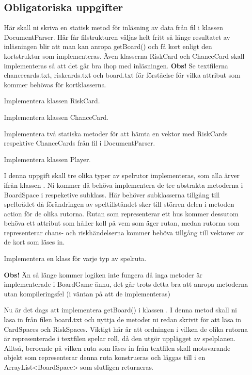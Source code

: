 \subsection{Obligatoriska uppgifter}

\Task Här skall ni skriva en statisk metod för inläsning av data från fil i klassen DocumentParser. Här får filstrukturen väljas helt fritt så länge resultatet av inläsningen blir att man kan anropa getBoard() och få kort enligt den kortstruktur som implementeras. Även klasserna RiskCard och ChanceCard skall implementeras så att det går bra ihop med inläsningen.\newline
\textbf{Obs!} Se textfilerna chancecards.txt, riskcards.txt och board.txt för förståelse för vilka attribut som kommer behövas för kortklasserna. 

\Subtask Implementera klassen RiskCard.

\Subtask Implementera klassen ChanceCard.

\Subtask Implementera två statiska metoder för att hämta en vektor med RiskCards respektive ChanceCards från fil i DocumentParser.

\Subtask Implementera klassen Player.

\Task I denna uppgift skall tre olika typer av spelrutor implementeras, som alla ärver ifrån klassen . Ni kommer då behöva implementera de tre abstrakta metoderna i BoardSpace i respeketive subklass. Här behöver subklasserna tillgång till spelbrädet då förändringen av speltillståndet sker till störren delen i metoden action för de olika rutorna. Rutan som representerar ett hus kommer dessutom behöva ett attribut som håller koll på vem som äger rutan, medan rutorna som representerar chans- och riskhändelserna kommer behöva tillgång till vektorer av de kort som läses in.


\Subtask Implementera en klass för varje typ av spelruta.

\textbf{Obs!} Än så länge kommer logiken inte fungera då inga metoder är implementerade i BoardGame ännu, det går trots detta bra att anropa metoderna utan kompileringsfel (i väntan på att de implementeras)

\Task Nu är det dags att implementera getBoard() i klassen . I denna metod skall ni läsa in från filen board.txt och nyttja de metoder ni redan skrivit för att läsa in CardSpaces och RiskSpaces. Viktigt här är att ordningen i vilken de olika rutorna är representerade i textfilen spelar roll, då den utgör upplägget av spelplanen. Alltså, beroende på vilken ruta som läses in från textfilen skall motsvarande objekt som representerar denna ruta konstrueras och läggas till i en ArrayList<BoardSpace> som slutligen returneras.

